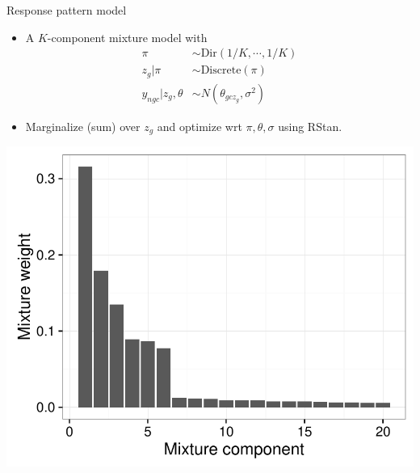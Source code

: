 \documentclass{beamer}
\begin{document}
\begin{frame}{Response pattern model}
\begin{itemize}
\item A $K$-component mixture model with
\begin{align*}
\pi &\sim \text{Dir}(1/K,\cdots,1/K) \\
z_g | \pi &\sim \text{Discrete}(\pi) \\
y_{ngc} | z_g, \theta &\sim N( \theta_{gcz_g}, \sigma^2 )
\end{align*}
\item Marginalize (sum) over $z_g$ and optimize wrt $\pi, \theta, \sigma$ using RStan. 
\end{itemize}
\centering
\includegraphics[width=.4\textwidth,clip,trim=0 0 0 0]{../figures/mixture_pi.pdf}
\end{frame}
\end{document}
